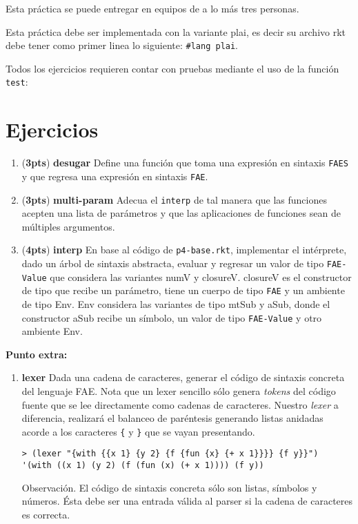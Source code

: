 \documentclass{article}
\newcommand{\grade}[1]{(\textbf{#1pts}) }
\begin{document}
Esta práctica se puede entregar en equipos de a lo más tres
personas.

Esta práctica debe ser implementada con la variante plai, es decir
su archivo rkt debe tener como primer linea lo siguiente:
\texttt{\#lang plai}.

Todos los ejercicios requieren contar con pruebas mediante el uso de
la función \texttt{test}:

\section{Ejercicios}

\begin{enumerate}

\item \grade{3} \textbf{desugar} Define una función que toma una expresión en sintaxis \texttt{FAES} y que regresa una expresión en sintaxis \texttt{FAE}.

\item \grade{3} \textbf{multi-param} Adecua el \texttt{interp} de tal manera que las funciones acepten una lista de parámetros y que las aplicaciones de funciones sean de múltiples argumentos.

\item \grade{4} \textbf{interp} En base al código de \texttt{p4-base.rkt}, implementar el intérprete, dado un árbol de sintaxis abstracta, evaluar y regresar un valor de tipo \texttt{FAE-Value} que considera las variantes numV y closureV. closureV es el constructor de tipo que recibe un parámetro, tiene un cuerpo de tipo \texttt{FAE} y un ambiente de tipo Env. Env considera las variantes de tipo mtSub y aSub, donde el constructor aSub recibe un símbolo, un valor de tipo \texttt{FAE-Value} y otro ambiente Env.

\end{enumerate}

\textbf{Punto extra:}
\begin{enumerate}
\item \textbf{lexer} Dada una cadena de caracteres, generar el código de sintaxis concreta del lenguaje FAE. Nota que un lexer sencillo sólo genera \emph{tokens} del código fuente que se lee directamente como cadenas de caracteres. Nuestro \emph{lexer} a diferencia, realizará el balanceo de paréntesis generando listas anidadas acorde a los caracteres \texttt{\{} y \texttt{\}} que se vayan presentando.
\begin{verbatim}
> (lexer "{with {{x 1} {y 2} {f {fun {x} {+ x 1}}}} {f y}}")
'(with ((x 1) (y 2) (f (fun (x) (+ x 1)))) (f y))
\end{verbatim}
Observación. El código de sintaxis concreta sólo son listas, símbolos y números. Ésta debe ser una entrada válida al parser si la cadena de caracteres es correcta.
\end{enumerate}
\end{document}
